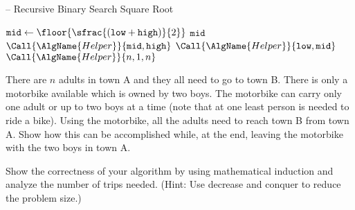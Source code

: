 \documentclass[draft]{article}
\begin{document}
\begin{solution}\mbox{}
    \begin{algorithm}[H]
        \caption[]{ -- Recursive Binary Search Square Root}
        \label{alg:recbinsqrt}
        \begin{algorithmic}[1]
             
            \State $\texttt{mid} \gets \floor{\sfrac{(\texttt{low} + \texttt{high})}{2}}$   
            \State \Return $\texttt{mid}$
             
            \State \Return $\Call{\AlgName{Helper}}{\texttt{mid},\texttt{high}}$
            \Else {}
            \State \Return $\Call{\AlgName{Helper}}{\texttt{low}, \texttt{mid}}$
            \EndIf
            \EndFunction
            \State \Return $\Call{\AlgName{Helper}}{n, 1, n}$
            \EndFunction
        \end{algorithmic}
    \end{algorithm}
\end{solution}

\begin{exercise}{2.9}
    There are $n$ adults in town A and they all need to go to town B. There is only a motorbike available which is owned by two boys.
    The motorbike can carry only one adult or up to two boys at a time (note that at one least person is needed to ride a bike). Using the motorbike, all the adults need to reach town B from town A.
    Show how this can be accomplished while, at the end, leaving the motorbike with the two boys in town A.

    Show the correctness of your algorithm by using mathematical induction and analyze the number of trips needed. (Hint: Use decrease and conquer to reduce the problem size.)
\end{exercise}
\end{document}
